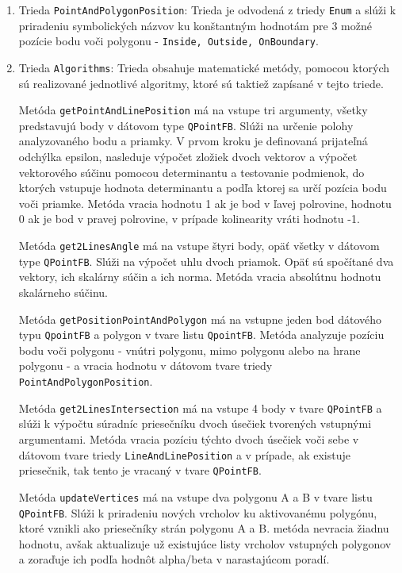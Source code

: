 \documentclass[11pt]{article}
\begin{document}
\begin{enumerate}
    
    \item Trieda \texttt{PointAndPolygonPosition}:
    Trieda je odvodená z triedy \texttt{Enum} a slúži k priradeniu symbolických názvov ku konštantným hodnotám pre 3 možné pozície bodu voči polygonu - \texttt{Inside, Outside, OnBoundary}.
    
    
    \item Trieda \texttt{Algorithms}:
    Trieda obsahuje matematické metódy, pomocou ktorých sú realizované jednotlivé algoritmy, ktoré sú taktiež zapísané v tejto triede.
    
    Metóda \texttt{getPointAndLinePosition} má na vstupe tri argumenty, všetky predstavujú body v dátovom type \texttt{QPointFB}. Slúži na určenie polohy analyzovaného bodu a priamky. V prvom kroku je definovaná prijateľná odchýlka epsilon, nasleduje výpočet zložiek dvoch vektorov a výpočet vektorového súčinu pomocou determinantu a testovanie podmienok, do ktorých vstupuje hodnota determinantu a podľa ktorej sa určí pozícia bodu voči priamke. Metóda vracia hodnotu 1 ak je bod v ľavej polrovine, hodnotu 0 ak je bod v pravej polrovine, v prípade kolinearity vráti hodnotu -1.
    
    Metóda \texttt{get2LinesAngle} má na vstupe štyri body, opäť všetky v dátovom type \texttt{QPointFB}. Slúži na výpočet uhlu dvoch priamok. Opäť sú spočítané dva vektory, ich skalárny súčin a ich norma. Metóda vracia absolútnu hodnotu skalárneho súčinu.
    
    Metóda \texttt{getPositionPointAndPolygon} má na vstupne jeden bod dátového typu \texttt{QpointFB} a polygon v tvare listu \texttt{QpointFB}. Metóda analyzuje pozíciu bodu voči polygonu - vnútri polygonu, mimo polygonu alebo na hrane polygonu - a vracia hodnotu v dátovom tvare triedy \texttt{PointAndPolygonPosition}.  
    
    Metóda \texttt{get2LinesIntersection} má na vstupe 4 body v tvare \texttt{QPointFB} a slúži k výpočtu súradníc priesečníku dvoch úsečiek tvorených vstupnými argumentami. Metóda vracia pozíciu týchto dvoch úsečiek voči sebe v dátovom tvare triedy \texttt{LineAndLinePosition} a v prípade, ak existuje priesečnik, tak tento je vracaný v tvare \texttt{QPointFB}.
    
    Metóda \texttt{updateVertices} má na vstupe dva polygonu A a B v tvare listu \texttt{QPointFB}. Slúži k priradeniu nových vrcholov ku aktivovanému polygónu, ktoré vznikli ako priesečníky strán polygonu A a B. metóda nevracia žiadnu hodnotu, avšak aktualizuje už existujúce listy vrcholov vstupných polygonov a zoraďuje ich podľa hodnôt alpha/beta v narastajúcom poradí.
    

\end{enumerate}
\end{document}
